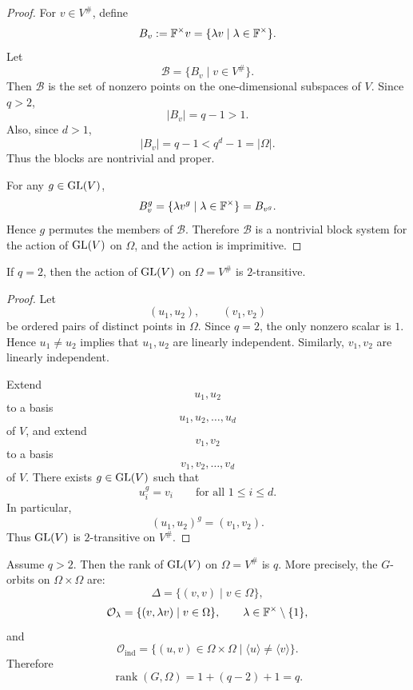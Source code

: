 \begin{proof}
For \(v\in V^\#\), define
\[
    B_v:=\mathbb{F}^\times v=\{\lambda v\mid \lambda\in \mathbb{F}^\times\}.
\]
Let
\[
    \mathcal B=\{B_v\mid v\in V^\#\}.
\]
Then \(\mathcal B\) is the set of nonzero points on the one-dimensional subspaces
of \(V\). Since \(q>2\),
\[
    |B_v|=q-1>1.
\]
Also, since \(d>1\),
\[
    |B_v|=q-1<q^d-1=|\Omega|.
\]
Thus the blocks are nontrivial and proper.

For any \(g\in \operatorname{GL}(V)\),
\[
    B_v^g
    =
    \{\lambda v^g\mid \lambda\in \mathbb{F}^\times\}
    =
    B_{v^g}.
\]
Hence \(g\) permutes the members of \(\mathcal B\). Therefore \(\mathcal B\) is a
nontrivial block system for the action of \(\GL(V)\) on \(\Omega\), and the action is
imprimitive.
\end{proof}

\begin{proposition}
If \(q=2\), then the action of \(\GL(V)\) on \(\Omega=V^\#\) is \(2\)-transitive.
\end{proposition}

\begin{proof}
Let
\[
    (u_1,u_2),\qquad (v_1,v_2)
\]
be ordered pairs of distinct points in \(\Omega\). Since \(q=2\), the only nonzero
scalar is \(1\). Hence \(u_1\neq u_2\) implies that \(u_1,u_2\) are linearly
independent. Similarly, \(v_1,v_2\) are linearly independent.

Extend
\[
    u_1,u_2
\]
to a basis
\[
    u_1,u_2,\ldots,u_d
\]
of \(V\), and extend
\[
    v_1,v_2
\]
to a basis
\[
    v_1,v_2,\ldots,v_d
\]
of \(V\). There exists \(g\in \operatorname{GL}(V)\) such that
\[
    u_i^g=v_i
    \qquad\text{for all }1\leq i\leq d.
\]
In particular,
\[
    (u_1,u_2)^g=(v_1,v_2).
\]
Thus \(\GL(V)\) is \(2\)-transitive on \(V^\#\).
\end{proof}

\begin{proposition}[Rank of \(\GL(V)\) on \(V^\#\)]
Assume \(q>2\). Then the rank of \(\GL(V)\) on \(\Omega=V^\#\) is \(q\).
More precisely, the \(G\)-orbits on \(\Omega\times\Omega\) are:
\[
    \Delta=\{(v,v)\mid v\in \Omega\},
\]
\[
    \mathcal O_\lambda
    =
    \{(v,\lambda v)\mid v\in \Omega\},
    \qquad \lambda\in \mathbb{F}^\times\setminus\{1\},
\]
and
\[
    \mathcal O_{\mathrm{ind}}
    =
    \{(u,v)\in \Omega\times\Omega\mid \langle u\rangle\neq \langle v\rangle\}.
\]
Therefore
\[
    \operatorname{rank}(G,\Omega)
    =
    1+(q-2)+1
    =
    q.
\]
\end{proposition}

